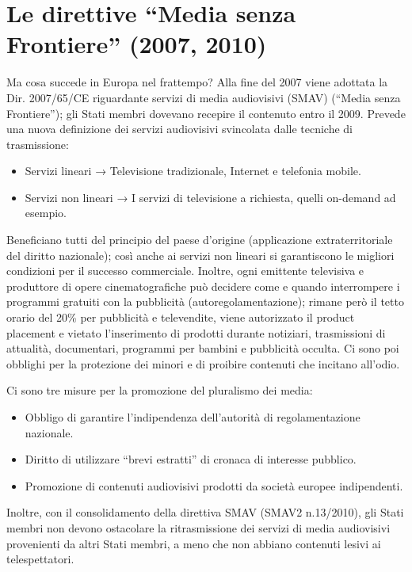 \section{Le direttive “Media senza Frontiere” (2007, 2010)}

Ma cosa succede in Europa nel frattempo? Alla fine del 2007 viene adottata la Dir. 2007/65/CE riguardante servizi di media audiovisivi (SMAV) (“Media senza Frontiere”); gli Stati membri dovevano recepire il contenuto entro il 2009. Prevede una nuova definizione dei servizi audiovisivi svincolata dalle tecniche di trasmissione:
\begin{itemize}
    \item Servizi lineari → Televisione tradizionale, Internet e telefonia mobile.
    \item Servizi non lineari → I servizi di televisione a richiesta, quelli on-demand ad esempio.
\end{itemize}

Beneficiano tutti del principio del paese d’origine (applicazione extraterritoriale del diritto nazionale); così anche ai servizi non lineari si garantiscono le migliori condizioni per il successo commerciale. Inoltre, ogni emittente televisiva e produttore di opere cinematografiche può decidere come e quando interrompere i programmi gratuiti con la pubblicità (autoregolamentazione); rimane però il tetto orario del 20\% per pubblicità e televendite, viene autorizzato il product placement e vietato l’inserimento di prodotti durante notiziari, trasmissioni di attualità, documentari, programmi per bambini e pubblicità occulta. Ci sono poi obblighi per la protezione dei minori e di proibire contenuti che incitano all’odio.


Ci sono tre misure per la promozione del pluralismo dei media:
\begin{itemize}
    \item Obbligo di garantire l’indipendenza dell’autorità di regolamentazione nazionale.
    \item Diritto di utilizzare “brevi estratti” di cronaca di interesse pubblico.
    \item Promozione di contenuti audiovisivi prodotti da società europee indipendenti.
\end{itemize}

Inoltre, con il consolidamento della direttiva SMAV (SMAV2 n.13/2010), gli Stati membri non devono ostacolare la ritrasmissione dei servizi di media audiovisivi provenienti da altri Stati membri, a meno che non abbiano contenuti lesivi ai telespettatori.


